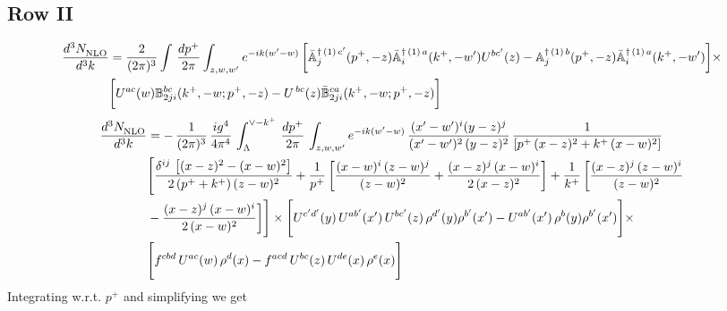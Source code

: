 \documentclass[9pt]{article}
\def\mf#1{\mathbb{#1}}
\numberwithin{equation}{section}
\begin{document}
\subsection{Row II\,}
\begin{align}
    \frac{d^{3}N_{\rm NLO}^{\rm}}{d^{3}k}  & =    \frac{2}{(2\pi)^{3}} \int\, \frac{dp^{+}}{2\pi}\int_{z,w,w^{\prime}} e^{-ik(w^{\prime}-w)}\,\bigg[\Bar{\mf{A}}^{\dagger\,(1)\, c^{\prime}}_{j}(p^{+},-z)\Bar{\mf{A}}^{\dagger\, (1)\, a}_{i}(k^{+},- w^{\prime})U^{bc^{\prime}}(z) - \mf{A}^{\dagger\, (1)\, b}_{j}(p^{+},- z)\Bar{\mf{A}}^{\dagger\, (1)\, a}_{i}(k^{+},- w^{\prime})\bigg] \times \notag \\ & \bigg[U^{ac}(w) \mf{B}^{bc}_{2ji}(k^{+},-w;p^{+},-z) -U^{\, bc}(z)\Bar{\mf{B}}^{ca}_{2ji}(k^{+},-w; p^{+},-z)\bigg] \nonumber
\end{align}
\begin{align}
    \frac{d^{3}N_{\rm NLO}^{\rm}}{d^{3}k}  & =  -\,\frac{1}{(2\pi)^{3}}\,\frac{ig^{4}}{4\pi^{4}}\,\int_{\Lambda}^{\vee-k^{+}}\,\frac{dp^{+}}{2\pi}\, \int_{z,w,w^{\prime}} e^{-ik(w^{\prime}-w)}\, \frac{(x'-w')^{i}(y-z)^{j}}{(x'-w')^{2}\,(y-z)^{2}}\, \frac{1}{\left[p^{+}\,(x-z)^{2}+k^{+}\,(x-w)^{2}\right]}\notag \\ & \Bigg[\frac{\delta^{ij}\, \left[(x-z)^{2}-(x-w)^{2}\right]}{2\, (p^{+}+k^{+})\,(z-w)^{2}}+\frac{1}{p^{+}}\, \bigg[\frac{(x-w)^{i}\,(z-w)^{j}}{(z-w)^{2}}+\frac{(x-z)^{j}\,(x-w)^{i}}{2\,(x-z)^{2}}\bigg]+\frac{1}{k^{+}}\,\bigg[\frac{(x-z)^{j}\,(z-w)^{i}}{(z-w)^{2}}\notag \\ & -\frac{(x-z)^{j}\,(x-w)^{i}}{2\,(x-w)^{2}}\bigg]\Bigg]\times \Bigg[U^{c'd'}(y)\,U^{ab'}(x')\,U^{bc'}(z)\,\rho^{d'}(y)\rho^{b'}(x')-U^{ab'}(x')\,\rho^{b}(y)\rho^{b'}(x')\Bigg]\times \notag \\ & \Bigg[f^{cbd}\,U^{ac}(w)\,\rho^{d}(x)-f^{acd}\, U^{bc}(z)\,U^{de}(x)\,\rho^{e}(x)\Bigg]
\end{align}
Integrating w.r.t. $p^{+}$ and simplifying we get
\end{document}
